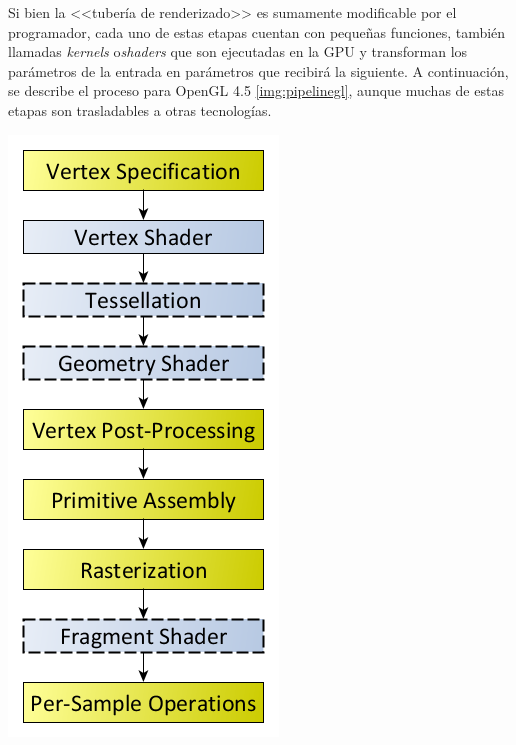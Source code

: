 Si bien la <<tubería de renderizado>> es sumamente modificable por el programador, cada uno de estas etapas cuentan con pequeñas funciones, también llamadas \textit{kernels} o\textit{shaders} que son ejecutadas en la GPU y transforman los parámetros de la entrada en parámetros que recibirá la siguiente. A continuación, se describe el proceso para OpenGL 4.5 \ref{img:pipelinegl}, aunque muchas de estas etapas son trasladables a otras tecnologías.

\vspace{5mm}
\begin{minipage}[h]{0.8\linewidth}
	\centering
	\includegraphics[width=0.4\linewidth]{assets/pipelinegl}
	\label{img:pipelinegl}
\end{minipage}

